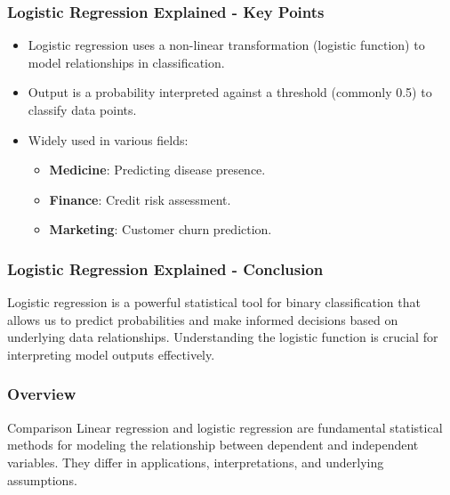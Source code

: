 \documentclass[aspectratio=169]{beamer}
\begin{document}
\begin{frame}[fragile]
    \frametitle{Logistic Regression Explained - Key Points}
    \begin{itemize}
        \item Logistic regression uses a non-linear transformation (logistic function) to model relationships in classification.
        \item Output is a probability interpreted against a threshold (commonly 0.5) to classify data points.
        \item Widely used in various fields:
        \begin{itemize}
            \item \textbf{Medicine}: Predicting disease presence.
            \item \textbf{Finance}: Credit risk assessment.
            \item \textbf{Marketing}: Customer churn prediction.
        \end{itemize}
    \end{itemize}
\end{frame}

\begin{frame}[fragile]
    \frametitle{Logistic Regression Explained - Conclusion}
    Logistic regression is a powerful statistical tool for binary classification that allows us to predict probabilities and make informed decisions based on underlying data relationships. Understanding the logistic function is crucial for interpreting model outputs effectively.
\end{frame}

\begin{frame}[fragile]
    \frametitle{Overview}
    \begin{block}{Comparison}
        Linear regression and logistic regression are fundamental statistical methods for modeling the relationship between dependent and independent variables. They differ in applications, interpretations, and underlying assumptions.
    \end{block}
\end{frame}
\end{document}
